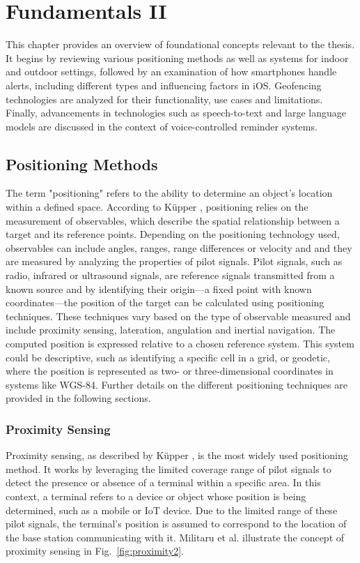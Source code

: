 \chapter{Fundamentals II}
\label{cha:Fundamentals II}

This chapter provides an overview of foundational concepts relevant to the thesis. It begins by reviewing various positioning methods as well as systems for indoor and outdoor settings, followed by an examination of how smartphones handle alerts, including different types and influencing factors in iOS. Geofencing technologies are analyzed for their functionality, use cases and limitations. Finally, advancements in technologies such as speech-to-text and large language models are discussed in the context of voice-controlled reminder systems.

\section{Positioning Methods}
The term "positioning" refers to the ability to determine an object's location within a defined space. According to K\"upper \cite{kupper2005location}, positioning relies on the measurement of observables, which describe the spatial relationship between a target and its reference points. Depending on the positioning technology used, observables can include angles, ranges, range differences or velocity and and they are measured by analyzing the properties of pilot signals. 
Pilot signals, such as radio, infrared or ultrasound signals, are reference signals transmitted from a known source and by identifying their origin—a fixed point with known coordinates—the position of the target can be calculated using positioning techniques. These techniques vary based on the type of observable measured and include proximity sensing, lateration, angulation and inertial navigation.
The computed position is expressed relative to a chosen reference system. This system could be descriptive, such as identifying a specific cell in a grid, or geodetic, where the position is represented as two- or three-dimensional coordinates in systems like WGS-84. Further details on the different positioning techniques are provided in the following sections.

\subsection{Proximity Sensing}
Proximity sensing, as described by K\"upper \cite{kupper2005location}, is the most widely used positioning method.
It works by leveraging the limited coverage range of pilot signals to detect the presence or absence of a terminal within a specific area. 
In this context, a terminal refers to a device or object whose position is being determined, such as a mobile or IoT device.
Due to the limited range of these pilot signals, the terminal's position is assumed to correspond to the location of the base station communicating with it.
Militaru et al. \cite{militaru2024positioning} illustrate the concept of proximity sensing in Fig.~\ref{fig:proximity2}.


